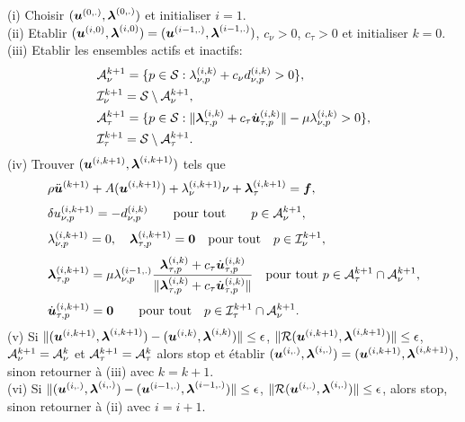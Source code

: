 \noindent (i) Choisir $(\mbox{\boldmath{$u$}}^{(0,.)},\mbox{\boldmath{$\lambda$}}^{(0,.)})$ et initialiser $i=1$.\\[3mm]
\qquad(ii) Etablir $(\mbox{\boldmath{$u$}}^{(i,0)},\mbox{\boldmath{$\lambda$}}^{(i,0)}) = (\mbox{\boldmath{$u$}}^{(i-1,.)},\mbox{\boldmath{$\lambda$}}^{(i-1,.)})$, $c_{\nu}>0$, $c_\tau>0$ et initialiser $k=0$.\\[3mm]
\qquad(iii) Etablir les ensembles actifs et inactifs:
\begin{align*}
&{\cal A}_{\nu}^{k+1}=\{p\in {\cal S}:\lambda^{(i,k)}_{\nu,p}+c_{\nu} d^{(i,k)}_{\nu,p}> 0\},\\
&{\cal I}_{\nu}^{k+1}={\cal S}\setminus {\cal A}_{\nu}^{k+1},\\
&{\cal A}_{\tau}^{k+1}=\{p\in {\cal S}:\|\mbox{\boldmath{$\lambda$}}_{\tau, p}^{(i,k)}+c_\tau \dot{\mbox{\boldmath{$u$}}}_{\tau, p}^{(i,k)}\|-\mu \lambda_{\nu, p}^{(i,k)}> 0\},\\
&{\cal I}_{\tau}^{k+1}={\cal S}\setminus {\cal A}_{\tau}^{k+1}.
\end{align*}
(iv) Trouver $(\mbox{\boldmath{$u$}}^{(i,k+1) },\mbox{\boldmath{$\lambda$}}^{(i,k+1) })$ tels que
\begin{eqnarray}
& \rho \ddot{\bu}^{(k+1)} + A(\bu^{(i,k+1)}) + \lambda_{\nu}^{(i,k+1)}\nu + \blambda_{\tau}^{(i,k+1)}= \fb, \\[1mm]
&\label{Anu}\delta u^{(i,k+1)}_{\nu,p} = -d^{(i,k)}_{\nu,p} \qquad {\rm pour \ tout} \qquad p\in {\cal A}_{\nu}^{k+1},\\[1mm]
&\label{Inu}\lambda^{(i,k+1)}_{\nu,p}=0, \quad \blambda^{(i,k+1)}_{\tau,p}=\bzero \quad {\rm pour \ tout} \quad p\in {\cal I}_{\nu}^{k+1},\\[1mm]
&\label{Atau}\blambda_{\tau, p}^{(i,k+1)} = \mu \lambda_{\nu, p}^{(i-1,.)} \frac{\blambda_{\tau, p}^{(i,k)}+c_\tau \dot\bu_{\tau, p}^{(i,k)}}{\|\blambda_{\tau, p}^{(i,k)}+c_\tau \dot\bu_{\tau, p}^{(i,k)}\|} \quad {\rm pour \ tout} \  p\in {\cal A}_{\tau}^{k+1}\cap {\cal A}_{\nu}^{k+1},\\[1mm]
&\label{Itau}\dot\bu_{\tau, p}^{(i,k+1)} =\bzero \qquad {\rm pour \ tout} \quad p\in {\cal I}_{\tau}^{k+1}\cap {\cal A}_{\nu}^{k+1}.
\end{eqnarray}
(v) Si $\|(\mbox{\boldmath{$u$}}^{(i,k+1) },\mbox{\boldmath{$\lambda$}}^{(i,k+1)})-(\mbox{\boldmath{$u$}}^{(i,k) },\mbox{\boldmath{$\lambda$}}^{(i,k)})\|\leq\epsilon$, $\|{\cal R}(\mbox{\boldmath{$u$}}^{(i,k+1) },\mbox{\boldmath{$\lambda$}}^{(i,k+1)})\|\leq\epsilon$, ${\cal A}_{\nu}^{k+1}={\cal A}_{\nu}^{k}$ et ${\cal A}_{\tau}^{k+1}={\cal A}_{\tau}^{k}$ alors stop et établir $(\mbox{\boldmath{$u$}}^{(i,.) },\mbox{\boldmath{$\lambda$}}^{(i,.)}) = (\mbox{\boldmath{$u$}}^{(i,k+1) },\mbox{\boldmath{$\lambda$}}^{(i,k+1)})$, sinon retourner à (iii) avec $k=k+1$.\\[1mm]
(vi) Si $\|(\mbox{\boldmath{$u$}}^{(i,.) },\mbox{\boldmath{$\lambda$}}^{(i,.)})-(\mbox{\boldmath{$u$}}^{(i-1,.) },\mbox{\boldmath{$\lambda$}}^{(i-1,.)})\|\leq\epsilon$, $\|{\cal R}(\mbox{\boldmath{$u$}}^{(i,.) },\mbox{\boldmath{$\lambda$}}^{(i,.)})\|\leq\epsilon$, alors stop, sinon retourner à (ii) avec $i=i+1$.\\[1mm]


